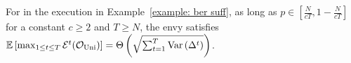\begin{proposition}\label{prop:insufficient}
    For in the execution in Example~\ref{example: ber suff}, as long as    
    $p\in \left[\frac{N}{cT}, 1-\frac{N}{cT}\right]$ for a constant $c \geq 2$ and $T \geq N$, the envy satisfies $\mathbb{E}\left[ \max_{1\leq t \leq T} \mathcal{E}^t  (\mathcal O_{\textnormal{Uni}}) \right] = \Theta\left(\sqrt{ \sum^{T}_{t=1}{\mathrm{Var}\left( \Delta^t \right)} }\right)$.
\end{proposition}

